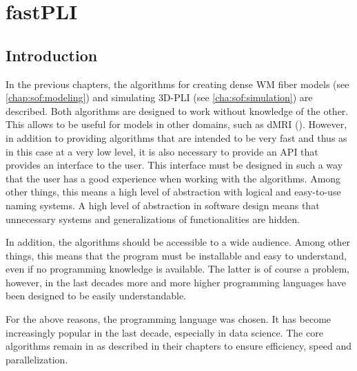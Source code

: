 \setcounter{chapter}{5}
\chapter{\acs{fastPLI}}
\label{chap:Software}
% 
% 
% 
% 
%  
\section{Introduction}\label{sec:fastpliIntro}
% 
In the previous chapters, the algorithms for creating dense \ac{WM} fiber models (see \cref{chap:sof:modeling}) and simulating \ac{3D-PLI} (see \cref{cha:sof:simulation}) are described.
Both algorithms are designed to work without knowledge of the other.
This allows \eg{} to be useful for models in other domains, such as \ac{dMRI} (\cite{Ginsburger2019,ginsburgerDis2019}).
However, in addition to providing algorithms that are intended to be very fast and thus as in this case at a very low level, it is also necessary to provide an \ac{API} that provides an interface to the user.
This interface must be designed in such a way that the user has a good experience when working with the algorithms.
Among other things, this means a high level of abstraction with logical and easy-to-use naming systems.
A high level of abstraction in software design means that unnecessary systems and generalizations of functionalities are hidden.
% 
\par
% 
In addition, the algorithms should be accessible to a wide audience.
Among other things, this means that the program must be installable and easy to understand, even if no programming knowledge is available.
The latter is of course a problem, however, in the last decades more and more higher programming languages have been designed to be easily understandable.
% 
\par
% 
For the above reasons, the \python{} programming language was chosen.
It has become increasingly popular in the last decade, especially in data science.
The core algorithms remain in \cpp{} as described in their chapters to ensure efficiency, speed and parallelization.
%
